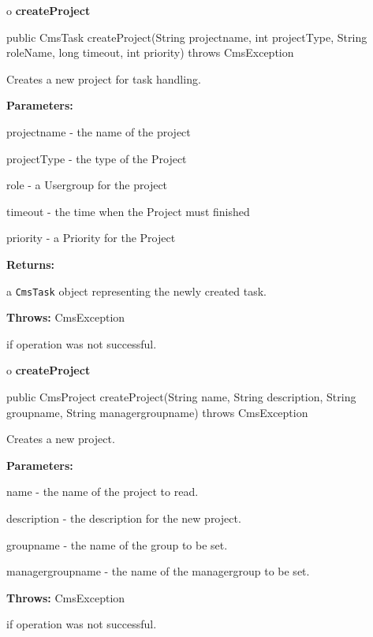 o {\bf createProject} 

\begin{PRE}
 public CmsTask createProject(String projectname,
                              int projectType,
                              String roleName,
                              long timeout,
                              int priority) throws CmsException
\end{PRE}

\begin{description}
\htmlDD Creates a new project for task handling. 

\begin{description}
\item {\bf Parameters:}  

projectname - the name of the project  

projectType - the type of the Project  

role - a Usergroup for the project  

timeout - the time when the Project must finished  

priority - a Priority for the Project  
\item {\bf Returns:}  

a {\tt CmsTask} object representing the newly created task.  
\item {\bf Throws:} CmsException  

if operation was not successful.  
\end{description}

\end{description}

o {\bf createProject} 

\begin{PRE}
 public CmsProject createProject(String name,
                                 String description,
                                 String groupname,
                                 String managergroupname) throws CmsException
\end{PRE}

\begin{description}
\htmlDD Creates a new project. 

\begin{description}
\item {\bf Parameters:}  

name - the name of the project to read.  

description - the description for the new project.  

groupname - the name of the group to be set.  

managergroupname - the name of the managergroup to be set.  
\item {\bf Throws:} CmsException  

if operation was not successful.  
\end{description}

\end{description}

